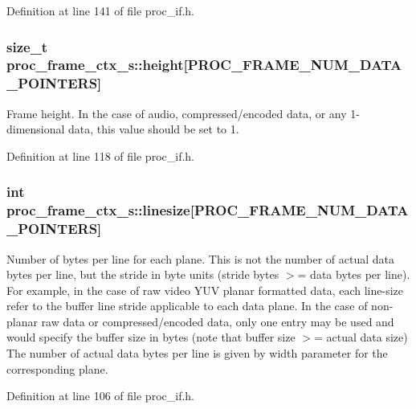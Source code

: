 Definition at line 141 of file proc\+\_\+if.\+h.

\subsubsection[{\texorpdfstring{height}{height}}]{\setlength{\rightskip}{0pt plus 5cm}size\+\_\+t proc\+\_\+frame\+\_\+ctx\+\_\+s\+::height\mbox{[}P\+R\+O\+C\+\_\+\+F\+R\+A\+M\+E\+\_\+\+N\+U\+M\+\_\+\+D\+A\+T\+A\+\_\+\+P\+O\+I\+N\+T\+E\+RS\mbox{]}}\hypertarget{structproc__frame__ctx__s_ab3f274e1a3c0df994275d29d7fce36da}{}\label{structproc__frame__ctx__s_ab3f274e1a3c0df994275d29d7fce36da}
Frame height. In the case of audio, compressed/encoded data, or any 1-\/dimensional data, this value should be set to 1. 

Definition at line 118 of file proc\+\_\+if.\+h.

\subsubsection[{\texorpdfstring{linesize}{linesize}}]{\setlength{\rightskip}{0pt plus 5cm}int proc\+\_\+frame\+\_\+ctx\+\_\+s\+::linesize\mbox{[}P\+R\+O\+C\+\_\+\+F\+R\+A\+M\+E\+\_\+\+N\+U\+M\+\_\+\+D\+A\+T\+A\+\_\+\+P\+O\+I\+N\+T\+E\+RS\mbox{]}}\hypertarget{structproc__frame__ctx__s_a68abb3bc396beba4b30cd13b2bcc8eda}{}\label{structproc__frame__ctx__s_a68abb3bc396beba4b30cd13b2bcc8eda}
Number of bytes per line for each plane. This is not the number of actual data bytes per line, but the stride in byte units (stride bytes $>$= data bytes per line). For example, in the case of raw video Y\+UV planar formatted data, each line-\/size refer to the buffer line stride applicable to each data plane. In the case of non-\/planar raw data or compressed/encoded data, only one entry may be used and would specify the buffer size in bytes (note that buffer size $>$= actual data size) The number of actual data bytes per line is given by \textquotesingle{}width\textquotesingle{} parameter for the corresponding plane. 

Definition at line 106 of file proc\+\_\+if.\+h.

